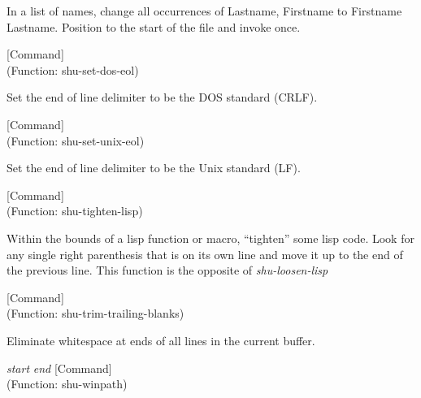 \begin{doc-string}
In a list of names, change all occurrences
of Lastname, Firstname to Firstname Lastname.
Position to the start of the file and invoke once.
\end{doc-string}

\vspace{1em}
\noindent
{}
\usebox{\funcname}
 \hfill [Command]\\%
 (Function: shu-set-dos-eol)

\begin{doc-string}
Set the end of line delimiter to be the DOS standard (CRLF).
\end{doc-string}

\vspace{1em}
\noindent
{}
\usebox{\funcname}
 \hfill [Command]\\%
 (Function: shu-set-unix-eol)

\begin{doc-string}
Set the end of line delimiter to be the Unix standard (LF).
\end{doc-string}

\vspace{1em}
\noindent
{}
\usebox{\funcname}
 \hfill [Command]\\%
 (Function: shu-tighten-lisp)

\begin{doc-string}
Within the bounds of a lisp function or macro, ``tighten'' some lisp code.
Look for any single right parenthesis that is on its own line and move it up to
the end of the previous line.  This function is the opposite of \emph{shu-loosen-lisp}
\end{doc-string}

\vspace{1em}
\noindent
{}
\usebox{\funcname}
 \hfill [Command]\\%
 (Function: shu-trim-trailing-blanks)

\begin{doc-string}
Eliminate whitespace at ends of all lines in the current buffer.
\end{doc-string}

\vspace{1em}
\noindent
{}
\usebox{\funcname}\emph{start} \emph{end}
 \hfill [Command]\\%
 (Function: shu-winpath)

